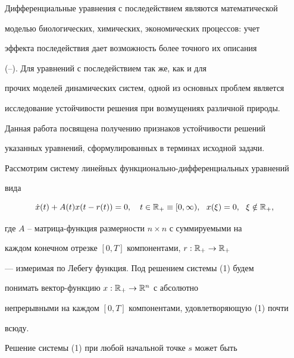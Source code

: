  




\maketitle 


\label{begin} 


 


Дифференциальные уравнения с последействием являются математической 


моделью биологических, химических, экономических процессов: учет 


эффекта последействия дает возможность более точного их описания 


(\cite{1}--\cite{3}). Для уравнений с последействием так же, как и для 


прочих моделей динамических систем, одной из основных проблем является 


исследование устойчивости решения при возмущениях различной природы. 


Данная работа посвящена получению признаков устойчивости решений 


указанных уравнений, сформулированных в терминах исходной задачи. 


 


Рассмотрим систему линейных функционально-дифференциальных уравнений 


вида 


\begin{equation} 


\Dot x(t)+A(t)x(t-r(t))=0,\quad t\in\Bbb R_+\equiv[0,\infty), 


\ \ x(\xi)=0,\ \ \xi\notin\Bbb R_+, 


\end{equation} 


где $A$ -- матрица-функция размерности $n\times n$ с суммируемыми на 


каждом конечном отрезке $[0,T]$ компонентами, $r:\Bbb R_+\to\Bbb R_+$ 


--- измеримая по Лебегу функция. Под решением системы (1) будем 


понимать вектор-функцию $x:\Bbb R_+\to\Bbb R^n$ с абсолютно 


непрерывными на каждом $[0,T]$ компонентами, удовлетворяющую (1) почти 


всюду. 


Решение системы (1) при любой начальной точке $s$ может быть 


